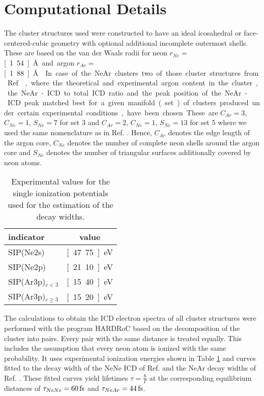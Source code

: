 \section{Computational Details}
\label{sec:computational}
The cluster structures used were constructed to have an ideal icosahedral or
face-centered-cubic geometry with optional additional incomplete outermost
shells. These are based on the van der Waals radii for neon
$r_{Ne}=$ \unit[1.54]{\AA}
and argon $r_{Ar}=$ \unit[1.88]{\AA} \cite{Bondi64}.
In case of the NeAr clusters two of those
cluster structures from Ref. \cite{Fasshauer14_1}, where the theoretical
and experimental argon content in the cluster,
the NeAr-ICD to total
ICD ratio and the peak position of the NeAr-ICD peak matched best for a given
manifold (set) of clusters produced under certain experimental conditions,
have been chosen.
These are $C_{Ar}=3$, $C_{Ne}=1$, $S_{Ne}=7$ for set 3
and $C_{Ar}=2$, $C_{Ne}=1$, $S_{Ne}=13$ for set 5 where we used the same
nomenclature as in Ref. \cite{Fasshauer14_1}. Hence, $C_{Ar}$ denotes
the edge length of the argon core, $C_{Ne}$ denotes the number of complete
neon shells around the argon core and $S_{Ne}$ denotes the number of 
triangular surfaces additionally covered by neon atoms.


\begin{table}[h]
 \caption{Experimental values for the single ionization potentials
          \cite{Fasshauer14_1}
          used for the estimation of the decay widths.}
 \label{table:exp_input}
 \centering
 \begin{tabular}{lc}
  \toprule
  indicator            &  value \\
  \midrule
  SIP(Ne2s)            &  \unit[47.75]{eV} \\
  SIP(Ne2p)            &  \unit[21.10]{eV} \\
  SIP(Ar3p)$_{c<3}$    &  \unit[15.40]{eV} \\
  SIP(Ar3p)$_{c\ge 3}$ &  \unit[15.20]{eV} \\
  \bottomrule
 \end{tabular}
\end{table}


The calculations to obtain the ICD electron spectra of all cluster
structures were performed with
the program HARDRoC \cite{HARDRoC} based on the decomposition of the cluster into
pairs. Every pair with the same distance is treated equally. This includes the
assumption that every neon atom is ionized with the same probability.
\cite{Fasshauer14_1,Fasshauer_thesis}
It uses experimental ionization energies shown
in Table \ref{table:exp_input} and curves fitted to the decay width of the
NeNe ICD of Ref. \cite{Averbukh06_1} and the NeAr decay widths of Ref.
\cite{Fasshauer14_1}. These fitted curves yield lifetimes
$\tau=\frac{\hbar}{\Gamma}$ at the corresponding equilibrium distances of
$\tau_{NeNe}= \unit[60]{fs}$ and
$\tau_{NeAr}= \unit[44]{fs}$.
